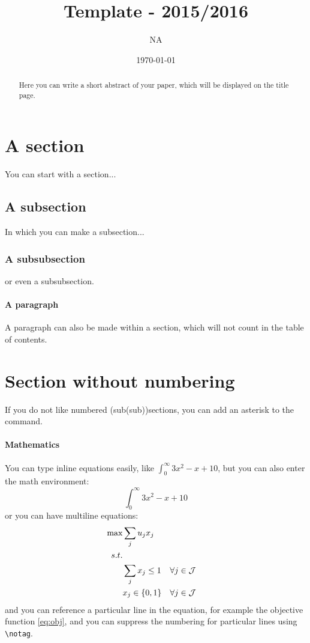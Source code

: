 \documentclass[a4paper,12pt]{article}
\title{Template - 2015/2016}
\author{NA}
\date{\today}
\begin{document}
\maketitle


\begin{abstract}
Here you can write a short abstract of your paper, which will be displayed on the title page.
\end{abstract}

\section{A section}
You can start with a section...

\subsection{A subsection}
In which you can make a subsection...

\subsubsection{A subsubsection}
or even a subsubsection.

\paragraph{A paragraph}
A paragraph can also be made within a section, which will not count in the table of contents.

\section*{Section without numbering}
If you do not like numbered (sub(sub))sections, you can add an asterisk to the command.

\paragraph{Mathematics}
You can type inline equations easily, like $\int_0^\infty 3x^2-x+10$, but you can also enter the math environment:
\[
\int_0^\infty 3x^2-x+10
\]
or you can have multiline equations:
\begin{align}
\max & \sum_{j} u_{j} x_{j} \label{eq:obj}\\
s.t. & \notag \\
&\sum_{j} x_{j} \leq 1 &&\forall j \in \mathcal{J} \label{eq:xonce}\\
&x_{j} \in \{0,1\} &&\forall j \in \mathcal{J} \label{eq:binarydecvar}
\end{align}
and you can reference a particular line in the equation, for example the objective function \eqref{eq:obj}, and you can suppress the numbering for particular lines using \texttt{\textbackslash notag}.
\end{document}
